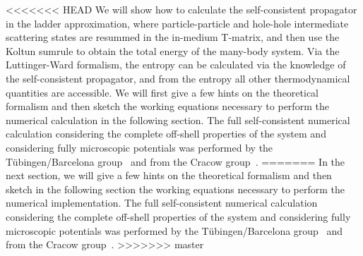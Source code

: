 <<<<<<< HEAD
We will show how to calculate the self-consistent propagator in the ladder approximation, where particle-particle and hole-hole intermediate scattering states are resummed in the in-medium T-matrix, and then use the Koltun sumrule to obtain the total energy of the many-body system. Via the Luttinger-Ward formalism, the entropy can be calculated via the knowledge of the self-consistent propagator, and from the entropy all other thermodynamical quantities are accessible. We will first give a few hints on the theoretical formalism and then sketch the working equations necessary to perform the numerical calculation in the following section. The full self-consistent numerical calculation considering the complete off-shell properties of the system and considering fully microscopic potentials was performed by the T\"ubingen/Barcelona group~\cite{Frick2003,Frick2005,Rios2006C74,Rios2008,Rios2009} and from the Cracow group~\cite{Soma2006,Soma2008,Soma2009}.
=======
In the next section, we will give a few hints on the theoretical formalism and then sketch in the following section the working equations necessary to perform the numerical implementation. The full self-consistent numerical calculation considering the complete off-shell properties of the system and considering fully microscopic potentials was performed by the T\"ubingen/Barcelona group~\cite{ch11_Frick2003,ch11_Frick2004PhD,ch11_Frick2005,ch11_Rios2006C74,ch11_Rios2008,ch11_Rios2009} and from the Cracow group~\cite{ch11_Soma2006,ch11_Soma2008,ch11_Soma2009,ch11_Soma2009phd}.
>>>>>>> master

